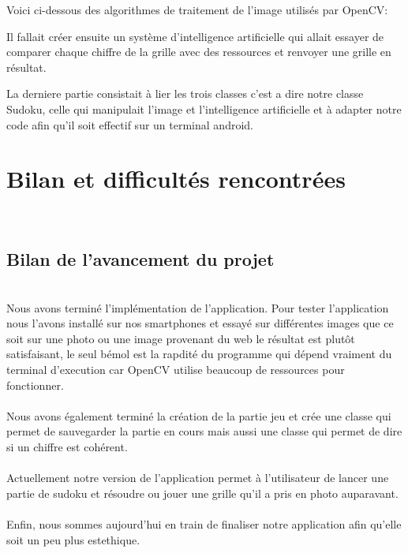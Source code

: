 \documentclass{article}
\begin{document}
Voici ci-dessous des algorithmes de traitement de l'image utilisés par OpenCV:

Il fallait créer ensuite un système d'intelligence artificielle qui  allait essayer de comparer chaque chiffre de la grille avec des ressources et renvoyer une grille en résultat.

La derniere partie consistait à lier les trois classes c'est a dire notre classe Sudoku, celle qui manipulait l'image et l'intelligence artificielle et à adapter notre code afin qu'il soit effectif sur un terminal android.





\newpage
\section{Bilan et difficultés rencontrées}~\\

\subsection{Bilan de l'avancement du projet}~\\
Nous avons terminé l'implémentation de l'application. Pour tester l'application nous l'avons installé sur nos smartphones et essayé sur différentes images que ce soit sur une photo ou une image provenant du web le résultat est plutôt satisfaisant, le seul bémol est la rapdité du programme qui dépend vraiment du terminal d'execution car OpenCV utilise beaucoup de ressources pour fonctionner.\\\\
Nous avons également terminé la création de la partie jeu et crée une classe qui permet de sauvegarder la partie en cours mais aussi une classe qui permet de dire si un chiffre est cohérent.\\\\
Actuellement notre version de l'application permet à l'utilisateur de lancer une partie de sudoku et résoudre ou jouer une grille qu'il a pris en photo auparavant.\\\\
Enfin, nous sommes aujourd'hui en train de finaliser notre application afin qu'elle soit un peu plus estethique.
\end{document}
